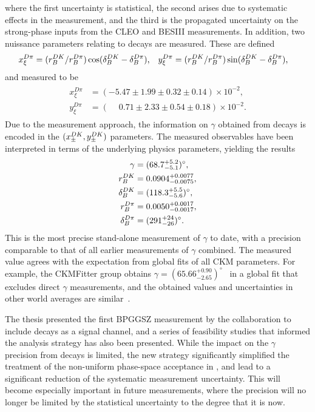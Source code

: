 where the first uncertainty is statistical, the second arises due to systematic effects in the measurement, and the third is the propagated uncertainty on the strong-phase inputs from the CLEO and BESIII measurements. In addition, two nuissance parameters relating to \BtoDpi decays are measured. These are defined
\begin{align}
    x_\xi^{{D}\pi} &= (r_B^{DK}/r_B^{D\pi}) \cos (\delta_B^{DK} - \delta_B^{D\pi}), & 
    y_\xi^{{D}\pi} &= (r_B^{DK}/r_B^{D\pi}) \sin (\delta_B^{DK} - \delta_B^{D\pi}),
\end{align}
and measured to be
\begin{align}
\begin{split}
    x_\xi^{D\pi} & = (         - 5.47 \pm 1.99 \pm  0.32\pm 0.14) \times 10^{-2}, \\
    y_\xi^{D\pi} & = (\phantom{-}0.71 \pm 2.33 \pm  0.54\pm 0.18) \times 10^{-2}. 
\end{split}
\end{align}
Due to the measurement approach, the information on $\gamma$ obtained from \BtoDpi decays is encoded in the $(x_\pm^{{D}{K}}, y_\pm^{{D}{K}})$ parameters. The measured observables have been interpreted in terms of the underlying physics parameters, yielding the results
\begin{align}
\begin{split}\label{eq:phys_results}
    \gamma          &= (68.7^{+5.2}_{-5.1})^\circ, \\
    r_B^{DK}       &= 0.0904^{+0.0077}_{-0.0075}, \\
    \delta_B^{DK}  &= (118.3^{+5.5}_{-5.6})^\circ, \\
    r_B^{{D}\pi}      &= 0.0050^{+0.0017}_{-0.0017}, \\
    \delta_B^{{D}\pi} &= (291^{+24}_{-26})^\circ.
\end{split}
\end{align}
This is the most precise stand-alone measurement of $\gamma$ to date, with a precision comparable to that of all earlier measurements of $\gamma$ combined. The measured value agrees with the expectation from global fits of all CKM parameters. For example, the CKMFitter group obtains  $\gamma = (65.66^{+0.90}_{-2.65})^\circ $~\cite{CKMfitter2015} in a global fit that excludes direct $\gamma$ measurements, and the obtained values and uncertainties in other world averages are similar~\cite{HFLAV,UTfit-UT}.

The thesis presented the first  BPGGSZ measurement by the \lhcb collaboration to include \BtoDpi decays as a signal channel, and a series of feasibility studies that informed the analysis strategy has also been presented. While the impact on the $\gamma$ precision from \BtoDpi decays is limited, the new strategy significantly simplified the treatment of the non-uniform phase-space acceptance in \lhcb, and lead to a significant reduction of the systematic measurement uncertainty. This will become especially important in future measurements, where the precision will no longer be limited by the statistical uncertainty to the degree that it is now.

